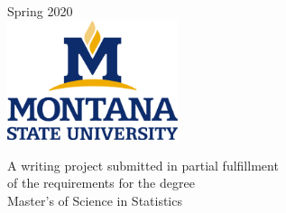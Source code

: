 \documentclass[12pt]{article}\usepackage[]{graphicx}\usepackage[]{color}
\begin{document}
\begin{titlepage}

{\large Spring 2020}\\[1.5cm] %


\includegraphics[width=5cm]{msulogo} %
 

A writing project submitted in partial fulfillment\\
of the requirements for the degree\\[.25in]
Master's of Science in Statistics

\vfill %

\end{titlepage}
\end{document}
